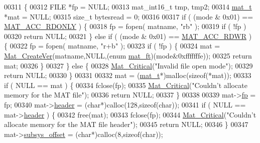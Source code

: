 \begin{DoxyCode}
{{{{{{{{{{{{{{{{00311 \{
00312     FILE *fp = NULL;
00313     mat\_int16\_t tmp, tmp2;
00314     \hyperlink{struct__mat__t}{mat\_t} *mat = NULL;
00315     \textcolor{keywordtype}{size\_t} bytesread = 0;
00316 
00317     \textcolor{keywordflow}{if} ( (mode & 0x01) == \hyperlink{group___m_a_t_ggaa9dcbc70f538af79bd557593ff6b5cdba8dd1457651b27ba9bea6cfba158c037c}{MAT\_ACC\_RDONLY} ) \{
00318         fp = fopen( matname, \textcolor{stringliteral}{"rb"} );
00319         \textcolor{keywordflow}{if} ( !fp )
00320             \textcolor{keywordflow}{return} NULL;
00321     \} \textcolor{keywordflow}{else} \textcolor{keywordflow}{if} ( (mode & 0x01) == \hyperlink{group___m_a_t_ggaa9dcbc70f538af79bd557593ff6b5cdba0f65f27ea42fde32d62b702b82329c1f}{MAT\_ACC\_RDWR} ) \{
00322         fp = fopen( matname, \textcolor{stringliteral}{"r+b"} );
00323         \textcolor{keywordflow}{if} ( !fp ) \{
00324             mat = \hyperlink{group___m_a_t_ga22d404f203af7869c841400e7ad247cf}{Mat\_CreateVer}(matname,NULL,(\textcolor{keyword}{enum} \hyperlink{group___m_a_t_gad03442b8378999189d510e3745c702b7}{mat\_ft})(mode&0xfffffffe));
00325             \textcolor{keywordflow}{return} mat;
00326         \}
00327     \} \textcolor{keywordflow}{else} \{
00328         \hyperlink{group__mat__util_gaf51f2bfbb5580f575e4dd79757e2b80c}{Mat\_Critical}(\textcolor{stringliteral}{"Invalid file open mode"});
00329         \textcolor{keywordflow}{return} NULL;
00330     \}
00331 
00332     mat = (\hyperlink{struct__mat__t}{mat\_t}*)malloc(\textcolor{keyword}{sizeof}(*mat));
00333     \textcolor{keywordflow}{if} ( NULL == mat ) \{
00334         fclose(fp);
00335         \hyperlink{group__mat__util_gaf51f2bfbb5580f575e4dd79757e2b80c}{Mat\_Critical}(\textcolor{stringliteral}{"Couldn't allocate memory for the MAT file"});
00336         \textcolor{keywordflow}{return} NULL;
00337     \}
00338 
00339     mat->\hyperlink{struct__mat__t_a85f562e407ca9ad4d2a6e14f839432b7}{fp} = fp;
00340     mat->\hyperlink{struct__mat__t_a5ed5d0e4e3c4d76b626a8a1772d579c4}{header}        = (\textcolor{keywordtype}{char}*)calloc(128,\textcolor{keyword}{sizeof}(\textcolor{keywordtype}{char}));
00341     \textcolor{keywordflow}{if} ( NULL == mat->\hyperlink{struct__mat__t_a5ed5d0e4e3c4d76b626a8a1772d579c4}{header} ) \{
00342         free(mat);
00343         fclose(fp);
00344         \hyperlink{group__mat__util_gaf51f2bfbb5580f575e4dd79757e2b80c}{Mat\_Critical}(\textcolor{stringliteral}{"Couldn't allocate memory for the MAT file header"});
00345         \textcolor{keywordflow}{return} NULL;
00346     \}
00347     mat->\hyperlink{struct__mat__t_a19317c01209959d755d69311960d3eec}{subsys\_offset} = (\textcolor{keywordtype}{char}*)calloc(8,\textcolor{keyword}{sizeof}(\textcolor{keywordtype}{char}));
}}}}}}}}}}}}}}}}
\end{DoxyCode}
